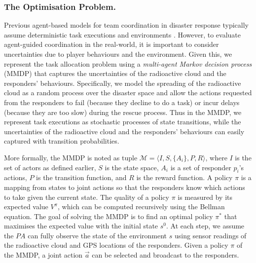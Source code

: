 \subsubsection{The Optimisation Problem.}
\label{sec:model}
Previous agent-based models for team coordination in disaster
response typically assume deterministic task executions and
environments \cite{ramchurn:etal:2010,Scerri2005}. However, to evaluate agent-guided coordination in the real-world, it is important to consider uncertainties due to
player behaviours and the environment. Given this, we represent the
task allocation problem using a {\em multi-agent Markov decision
process} (MMDP) that captures the uncertainties of the radioactive
cloud and the responders' behaviours. Specifically, we model
the spreading of the radioactive cloud as a random process over the
disaster space and allow the actions requested from the responders
to  fail (because they decline to do a  task) or incur delays
(because they are too slow) during the rescue process. Thus in the
MMDP, we represent  task executions as stochastic processes
of state transitions, while the uncertainties of the radioactive
cloud and the responders' behaviours can easily captured with
transition probabilities.

More formally, the MMDP is noted as tuple $\mathcal{M} =
\langle I, S, \{A_i\}, P, R \rangle$, where $I$ is the set of
actors as defined earlier,  $S$ is the state space,
$A_i$ is a set of responder $p_i$'s actions, $P$ is the transition
function, and $R$ is the reward function. A policy $\pi$ is a
mapping from states to joint actions so that the responders know
which actions to take given the current state. The quality of a
policy $\pi$ is measured by its expected value $V^\pi$, which can
be computed recursively using the Bellman equation. The goal of
solving the MMDP is to find an optimal policy $\pi^*$ that
maximises the expected value with the initial state $s^0$. At each
step, we assume the $PA$ can fully observe the
state of the environment $s$ using sensor readings of the
radioactive cloud and GPS locations of the responders. Given a
policy $\pi$ of the MMDP, a joint action $\vec{a}$ can be selected
and broadcast to the responders.
